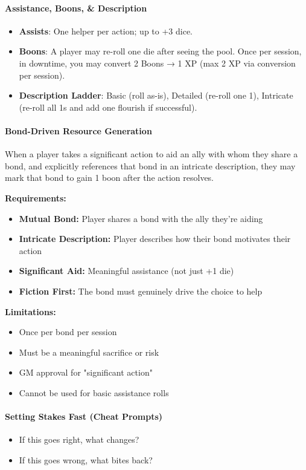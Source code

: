 \documentclass[11pt]{article}
\begin{document}
\paragraph{Assistance, Boons, \& Description}
\begin{itemize}
    \item \textbf{Assists}: One helper per action; up to +3 dice.
    \item \textbf{Boons}: A player may re-roll one die after seeing the pool. Once per session, in downtime, you may convert 2 Boons → 1 XP (max 2 XP via conversion per session).
    \item \textbf{Description Ladder}: Basic (roll as-is), Detailed (re-roll one 1), Intricate (re-roll all 1s and add one flourish if successful).
\end{itemize}

\paragraph{Bond-Driven Resource Generation}
When a player takes a significant action to aid an ally with whom they share a bond, and explicitly references that bond in an intricate description, they may mark that bond to gain 1 boon after the action resolves.

\textbf{Requirements:}
\begin{itemize}
    \item \textbf{Mutual Bond:} Player shares a bond with the ally they're aiding
    \item \textbf{Intricate Description:} Player describes how their bond motivates their action
    \item \textbf{Significant Aid:} Meaningful assistance (not just +1 die)
    \item \textbf{Fiction First:} The bond must genuinely drive the choice to help
\end{itemize}

\textbf{Limitations:}
\begin{itemize}
    \item Once per bond per session
    \item Must be a meaningful sacrifice or risk
    \item GM approval for "significant action"
    \item Cannot be used for basic assistance rolls
\end{itemize}

\paragraph{Setting Stakes Fast (Cheat Prompts)}
\begin{itemize}
    \item If this goes right, what changes?
    \item If this goes wrong, what bites back?
\end{itemize}
\end{document}
